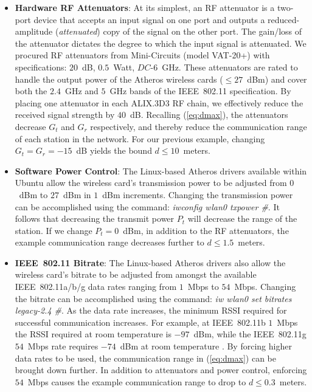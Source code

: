 \documentclass{article}
\newenvironment{myitemize}{
	\begin{itemize}
	\setlength{\itemsep}{1pt}
	\setlength{\parskip}{0pt}
	\setlength{\parsep}{0pt}}{\end{itemize}
	}
\begin{document}
\begin{myitemize}

\item \textbf{Hardware RF Attenuators}:
  At its simplest, an RF attenuator is a two-port device that accepts an input signal on one port and outputs a reduced-amplitude (\emph{attenuated}) copy of the signal on the other port.
  The gain/loss of the attenuator dictates the degree to which the input signal is attenuated.
  We procured RF attenuators from Mini-Circuits (model VAT-20+) with specifications: \(20\)~dB, \(0.5\)~Watt, \(DC\)-\(6\)~GHz.  These attenuators are rated to handle the output power of the Atheros wireless cards (\(\leq 27\)~dBm) and cover both the \(2.4\)~GHz and \(5\)~GHz bands of the IEEE~802.11 specification.
  By placing one attenuator in each ALIX.3D3 RF chain, we effectively reduce the received signal strength by \(40\)~dB.
  Recalling (\ref{eq:dmax}), the attenuators decrease \(G_t\) and \(G_r\) respectively, and thereby reduce the communication range of each station in the network.
  For our previous example, changing \(G_t = G_r = -15\)~dB yields the bound \(d \leq 10\)~meters.


\item \textbf{Software Power Control}:
  The Linux-based Atheros drivers available within Ubuntu allow the wireless card's transmission power to be adjusted from \(0\)~dBm to \(27\)~dBm in \(1\)~dBm increments.
  Changing the transmission power can be accomplished using the command: \emph{iwconfig wlan0 txpower \#}.
  It follows that decreasing the transmit power \(P_t\) will decrease the range of the station.
  If we change \(P_t = 0\)~dBm, in addition to the RF attenuators, the example communication range decreases further to \(d \leq 1.5\)~meters.


\item \textbf{IEEE~802.11 Bitrate}:
  The Linux-based Atheros drivers also allow the wireless card's bitrate to be adjusted from amongst the available IEEE~802.11a/b/g data rates ranging from \(1\)~Mbps to \(54\)~Mbps.
  Changing the bitrate can be accomplished using the command: \emph{iw wlan0 set bitrates legacy-2.4 \#}.
  As the data rate increases, the minimum RSSI required for successful communication increases.
  For example, at IEEE~802.11b \(1\)~Mbps the RSSI required at room temperature is \(-97\)~dBm, while the IEEE~802.11g \(54\)~Mbps rate requires \(-74\)~dBm at room temperature \cite{dcma82}.
  By forcing higher data rates to be used, the communication range in (\ref{eq:dmax}) can be brought down further.
  In addition to attenuators and power control, enforcing \(54\)~Mbps causes the example communication range to drop to \(d \leq 0.3\)~meters.



\end{myitemize}
\end{document}
